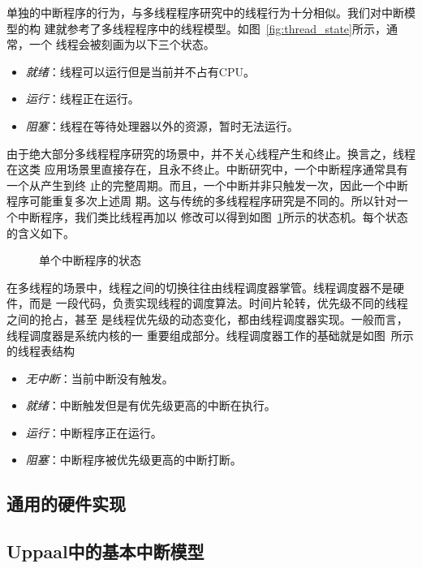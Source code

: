 单独的中断程序的行为，与多线程程序研究中的线程行为十分相似。我们对中断模型的构
建就参考了多线程程序中的线程模型。如图~\ref{fig:thread_state}所示，通常，一个
线程会被刻画为以下三个状态。
\begin{itemize}
	\item \emph{就绪}：线程可以运行但是当前并不占有CPU。
	\item \emph{运行}：线程正在运行。
	\item \emph{阻塞}：线程在等待处理器以外的资源，暂时无法运行。
\end{itemize}
由于绝大部分多线程程序研究的场景中，并不关心线程产生和终止。换言之，线程在这类
应用场景里直接存在，且永不终止。中断研究中，一个中断程序通常具有一个从产生到终
止的完整周期。而且，一个中断并非只触发一次，因此一个中断程序可能重复多次上述周
期。这与传统的多线程程序研究是不同的。所以针对一个中断程序，我们类比线程再加以
修改可以得到如图~\ref{fig:interrupt_state}所示的状态机。每个状态的含义如下。

\begin{figure}[H]
	\centering
	
	\caption{单个中断程序的状态}
	\label{fig:interrupt_state}
\end{figure}

在多线程的场景中，线程之间的切换往往由线程调度器掌管。线程调度器不是硬件，而是
一段代码，负责实现线程的调度算法。时间片轮转，优先级不同的线程之间的抢占，甚至
是线程优先级的动态变化，都由线程调度器实现。一般而言，线程调度器是系统内核的一
重要组成部分。线程调度器工作的基础就是如图~所示的线程表结构

\begin{itemize}
	\item \emph{无中断}：当前中断没有触发。
	\item \emph{就绪}：中断触发但是有优先级更高的中断在执行。
	\item \emph{运行}：中断程序正在运行。
	\item \emph{阻塞}：中断程序被优先级更高的中断打断。
\end{itemize}

\subsection{通用的硬件实现}
\label{subsec:basic_hardware}

\subsection{Uppaal中的基本中断模型}
\label{subsec:basic_uppaal}

